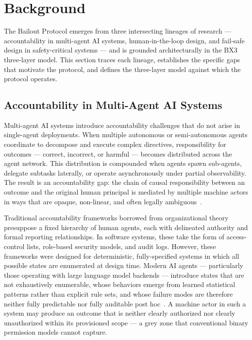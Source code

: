 \section{Background}
\label{sec:background}

The Bailout Protocol emerges from three intersecting lineages of research — accountability in multi-agent AI systems, human-in-the-loop design, and fail-safe design in safety-critical systems — and is grounded architecturally in the BX3 three-layer model. This section traces each lineage, establishes the specific gaps that motivate the protocol, and defines the three-layer model against which the protocol operates.

\subsection{Accountability in Multi-Agent AI Systems}
\label{sec:accountability}

Multi-agent AI systems introduce accountability challenges that do not arise in single-agent deployments. When multiple autonomous or semi-autonomous agents coordinate to decompose and execute complex directives, responsibility for outcomes — correct, incorrect, or harmful — becomes distributed across the agent network. This distribution is compounded when agents spawn sub-agents, delegate subtasks laterally, or operate asynchronously under partial observability. The result is an accountability gap: the chain of causal responsibility between an outcome and the original human principal is mediated by multiple machine actors in ways that are opaque, non-linear, and often legally ambiguous~\cite{bansal2019}.

Traditional accountability frameworks borrowed from organizational theory presuppose a fixed hierarchy of human agents, each with delineated authority and formal reporting relationships. In software systems, these take the form of access-control lists, role-based security models, and audit logs. However, these frameworks were designed for deterministic, fully-specified systems in which all possible states are enumerated at design time. Modern AI agents — particularly those operating with large language model backends — introduce states that are not exhaustively enumerable, whose behaviors emerge from learned statistical patterns rather than explicit rule sets, and whose failure modes are therefore neither fully predictable nor fully auditable post hoc~\cite{dijkstra1982}. A machine actor in such a system may produce an outcome that is neither clearly authorized nor clearly unauthorized within its provisioned scope — a grey zone that conventional binary permission models cannot capture.

